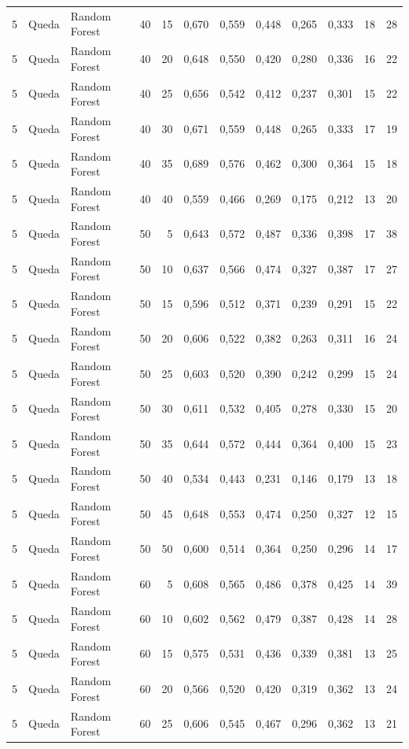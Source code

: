 \begin{longtable}{@{}rllrrrrrrrrr@{}}
5 & Queda & Random Forest & 40 & 15 & 0,670 & 0,559 & 0,448 & 0,265 & 0,333 & 18 & 28 \\
5 & Queda & Random Forest & 40 & 20 & 0,648 & 0,550 & 0,420 & 0,280 & 0,336 & 16 & 22 \\
5 & Queda & Random Forest & 40 & 25 & 0,656 & 0,542 & 0,412 & 0,237 & 0,301 & 15 & 22 \\
5 & Queda & Random Forest & 40 & 30 & 0,671 & 0,559 & 0,448 & 0,265 & 0,333 & 17 & 19 \\
5 & Queda & Random Forest & 40 & 35 & 0,689 & 0,576 & 0,462 & 0,300 & 0,364 & 15 & 18 \\
5 & Queda & Random Forest & 40 & 40 & 0,559 & 0,466 & 0,269 & 0,175 & 0,212 & 13 & 20 \\
5 & Queda & Random Forest & 50 & 5 & 0,643 & 0,572 & 0,487 & 0,336 & 0,398 & 17 & 38 \\
5 & Queda & Random Forest & 50 & 10 & 0,637 & 0,566 & 0,474 & 0,327 & 0,387 & 17 & 27 \\
5 & Queda & Random Forest & 50 & 15 & 0,596 & 0,512 & 0,371 & 0,239 & 0,291 & 15 & 22 \\
5 & Queda & Random Forest & 50 & 20 & 0,606 & 0,522 & 0,382 & 0,263 & 0,311 & 16 & 24 \\
5 & Queda & Random Forest & 50 & 25 & 0,603 & 0,520 & 0,390 & 0,242 & 0,299 & 15 & 24 \\
5 & Queda & Random Forest & 50 & 30 & 0,611 & 0,532 & 0,405 & 0,278 & 0,330 & 15 & 20 \\
5 & Queda & Random Forest & 50 & 35 & 0,644 & 0,572 & 0,444 & 0,364 & 0,400 & 15 & 23 \\
5 & Queda & Random Forest & 50 & 40 & 0,534 & 0,443 & 0,231 & 0,146 & 0,179 & 13 & 18 \\
5 & Queda & Random Forest & 50 & 45 & 0,648 & 0,553 & 0,474 & 0,250 & 0,327 & 12 & 15 \\
5 & Queda & Random Forest & 50 & 50 & 0,600 & 0,514 & 0,364 & 0,250 & 0,296 & 14 & 17 \\
5 & Queda & Random Forest & 60 & 5 & 0,608 & 0,565 & 0,486 & 0,378 & 0,425 & 14 & 39 \\
5 & Queda & Random Forest & 60 & 10 & 0,602 & 0,562 & 0,479 & 0,387 & 0,428 & 14 & 28 \\
5 & Queda & Random Forest & 60 & 15 & 0,575 & 0,531 & 0,436 & 0,339 & 0,381 & 13 & 25 \\
5 & Queda & Random Forest & 60 & 20 & 0,566 & 0,520 & 0,420 & 0,319 & 0,362 & 13 & 24 \\
5 & Queda & Random Forest & 60 & 25 & 0,606 & 0,545 & 0,467 & 0,296 & 0,362 & 13 & 21 \\

\end{longtable}
